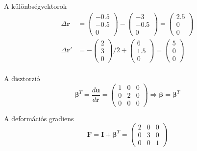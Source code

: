 \documentclass[12pt,a4paper]{scrartcl}
\let\mathbf\bm
\begin{document}
A különbségvektorok
\[\begin{aligned}
  \Delta {\mathbf{r}} &  = \left( {\begin{array}{*{20}{c}}
  { - 0.5} \\ 
  { - 0.5} \\ 
  0 
\end{array}} \right) - \left( {\begin{array}{*{20}{c}}
  { - 3} \\ 
  { - 0.5} \\ 
  0 
\end{array}} \right) = \left( {\begin{array}{*{20}{c}}
  {2.5} \\ 
  0 \\ 
  0 
\end{array}} \right) \\ 
  \Delta {\mathbf{r}}' &  =  - \left( {\begin{array}{*{20}{c}}
  2 \\ 
  3 \\ 
  0 
\end{array}} \right)/2 + \left( {\begin{array}{*{20}{c}}
  6 \\ 
  {1.5} \\ 
  0 
\end{array}} \right) = \left( {\begin{array}{*{20}{c}}
  5 \\ 
  0 \\ 
  0 
\end{array}} \right) \\ 
\end{aligned} \]

A disztorzió
\[{{\mathbf{\beta }}^T} = \frac{{d{\mathbf{u}}}}{{d{\mathbf{r}}}} = \left( {\begin{array}{*{20}{c}}
  1&0&0 \\ 
  0&2&0 \\ 
  0&0&0 
\end{array}} \right) \Rightarrow {\mathbf{\beta }} = {{\mathbf{\beta }}^T}\]

A deformációs gradiens 
\[{\mathbf{F}} = {\mathbf{I}} + {{\mathbf{\beta }}^T} = \left( {\begin{array}{*{20}{c}}
  2&0&0 \\ 
  0&3&0 \\ 
  0&0&1 
\end{array}} \right)\]
\end{document}
